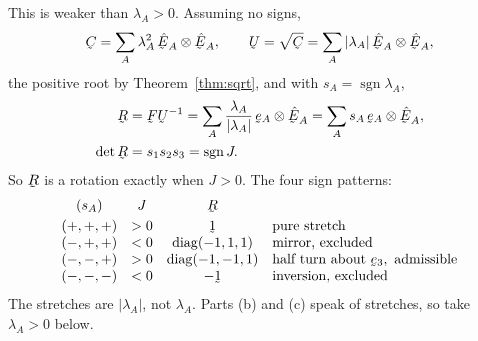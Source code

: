 \begin{solution}
This is weaker than $\lambda_{A}>0$. Assuming no signs,
\[
   \bC=\sum_{A}\lambda_{A}^{2}\,\hbE_{A}\otimes\hbE_{A},
   \qquad
   \bU=\sqrt{\bC}=\sum_{A}|\lambda_{A}|\,\hbE_{A}\otimes\hbE_{A},
\]
the positive root by Theorem~\ref{thm:sqrt}, and with
$s_{A}=\operatorname{sgn}\lambda_{A}$,
\[
\begin{aligned}
   \bR&=\bF\bU^{-1}
   =\sum_{A}\frac{\lambda_{A}}{|\lambda_{A}|}\,\be_{A}\otimes\hbE_{A}
   =\sum_{A}s_{A}\,\be_{A}\otimes\hbE_{A},\\
   \det\bR&=s_{1}s_{2}s_{3}=\operatorname{sgn}J .
\end{aligned}
\]
So $\bR$ is a rotation exactly when $J>0$. The four sign patterns:
\[
\begin{array}{cccl}
   (s_{A}) & J & \bR & \\[1mm]
   (+,+,+) & >0 & \shift & \text{pure stretch}\\
   (-,+,+) & <0 & \operatorname{diag}(-1,1,1) & \text{mirror, excluded}\\
   (-,-,+) & >0 & \operatorname{diag}(-1,-1,1) &
     \text{half turn about }\be_{3},\ \text{admissible}\\
   (-,-,-) & <0 & -\shift & \text{inversion, excluded}
\end{array}
\]
The stretches are $|\lambda_{A}|$, not $\lambda_{A}$. Parts (b) and (c)
speak of stretches, so take $\lambda_{A}>0$ below.



\end{solution}
